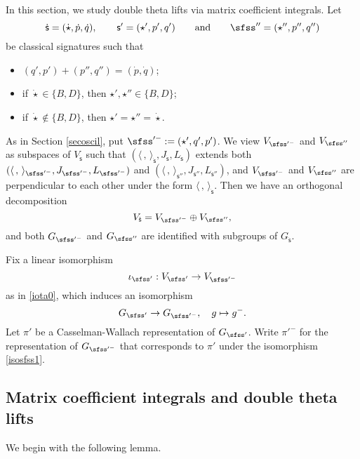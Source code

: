 \documentclass[12pt,a4paper]{amsart}
\newcommand{\la}{\langle}
\newcommand{\ra}{\rangle}
\newcommand{\be}{\begin {equation}}
\newcommand{\ee}{\end {equation}}
\numberwithin{equation}{section}
\theoremstyle{remark}
\begin{document}
\def\GLE{\GL(\bfE)^{J_{\bfU}}}
\def\GLEz{\GL_{\bfE_0}}
\def\GLE{{\GL_{\bfE}}}
\def\wtGLE{\widetilde{\GLE}}
\def\wtGLEz{\widetilde{\GLEz}}
\def\wtPE{\widetilde{P_\bfE}}
\def\JU{{J_{\bfU}}}
\def\LU{{L_{\bfU}}}
\def\wtGU{\widetilde{G}_\bfU}
\def\dsfss{{\dot{\mathsf s}}}


In this section, 
we  study double theta lifts via
matrix coefficient integrals. Let 
\[
\dot{ \mathsf s}=(\dot \star, \dot p,\dot q),\qquad  \mathsf s'=(\star', p',q')\qquad \textrm{and}\qquad \sfss''=(\star'', p'', q'')
\]
be classical signatures such that 
\begin{itemize}
  \item $ (q', p')+(p'', q'')=(\dot p, \dot q)$;\smallskip
  \item if $\dot \star\in \{B,D\}$,  then $\star', \star''\in \{B,D\}$; \smallskip
  \item if $\dot \star\notin \{B,D\}$,  then $\star'=\star''=\dot \star$. 
\end{itemize}
As in Section \ref{secoscil}, put $\sfss'^-:=(\star', q', p')$. We view $V_{\sfss'^-}$ and $V_{\sfss''}$ as subspaces of $V_\dsfss$ such that $(\la\,,\,\ra_{\dsfss}, J_{\dsfss},L_{\dsfss})$  extends both $(\la\,,\,\ra_{\sfss'^-}, J_{\sfss'^-}, L_{\sfss'^-})$ and 
$(\la\,,\,\ra_{\mathsf s''}, J_{\mathsf s''}, L_{\mathsf s''})$, and $V_{\sfss'^-}$ and $V_{\sfss''}$ are perpendicular to each other under the form $\la\,,\,\ra_{\dsfss}$. Then we have an orthogonal decomposition 
\[
  V_\dsfss=V_{\sfss'^-}\oplus V_{\sfss''},
\]
and both $G_{\sfss'^-}$ and $G_{\sfss''}$ are identified with subgroups of $G_{\dsfss}$.

 Fix a linear isomorphism 
\be\label{iota1}
 \iota_{\sfss'}:  V_{\sfss'}\rightarrow V_{\sfss'^-}%
\ee
as in \eqref{iota0}, which  induces an isomorphism
\be\label{isosfss1}
 G_{\sfss'}\rightarrow G_{\sfss'^-}, \quad g\mapsto g^-.
\ee
Let $\pi'$ be a Casselman-Wallach representation of $G_{\sfss'}$. Write $\pi'^-$ for the representation of $G_{\sfss'^-}$ that corresponds to $\pi'$ under the isomorphism \eqref{isosfss1}.



\subsection{Matrix coefficient integrals and double theta lifts}

We begin with the following lemma.
\end{document}
